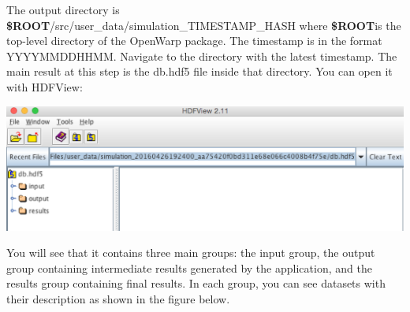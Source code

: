 \documentclass[12pt]{article}
\newcommand{\ROOT}{{\textbf{\$ROOT}}}
\begin{document}
The output directory is \ROOT/src/user_data/simulation_TIMESTAMP_HASH where \ROOT is the top-level directory of the OpenWarp package.
The timestamp is in the format YYYYMMDDHHMM. Navigate to the directory with the latest timestamp.
The main result at this step is the db.hdf5 file inside that directory. You can open it with HDFView:

\vspace{\abovedisplayskip}
\begin{minipage}{\linewidth}
	\centering
	\includegraphics[scale=0.6]{img/31}
\end{minipage}
\vspace{\belowdisplayskip}

You will see that it contains three main groups: the input group, the output group containing intermediate results generated by the application, and the results group containing final results. In each group, you can see datasets with their description as shown in the figure below.
\end{document}
